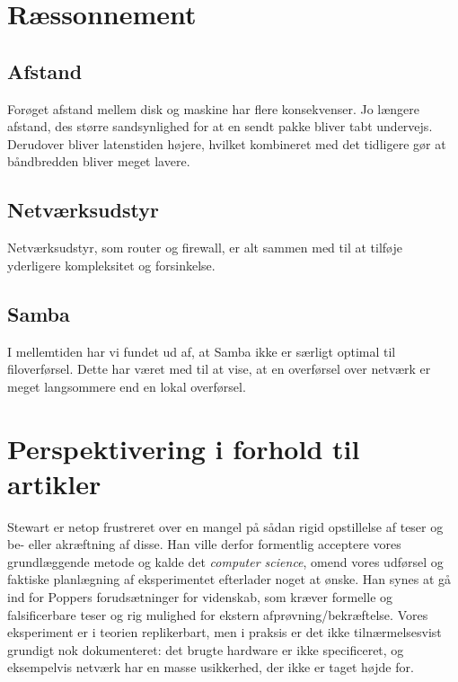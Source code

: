 \documentclass{article}
\begin{document}
\section{Ræssonnement}

\subsection{Afstand}
Forøget afstand mellem disk og maskine har flere konsekvenser. Jo længere afstand, des større sandsynlighed for at en sendt pakke bliver tabt undervejs. Derudover bliver latenstiden højere, hvilket kombineret med det tidligere gør at båndbredden bliver meget lavere.

\subsection{Netværksudstyr}
Netværksudstyr, som router og firewall, er alt sammen med til at tilføje yderligere kompleksitet og forsinkelse.

\subsection{Samba}
I mellemtiden har vi fundet ud af, at Samba ikke er særligt optimal til filoverførsel. Dette har været med til at vise, at en overførsel over netværk er meget langsommere end en lokal overførsel.

\section{Perspektivering i forhold til artikler}

Stewart er netop frustreret over en mangel på sådan rigid opstillelse af teser og be- eller akræftning af disse. Han ville derfor formentlig acceptere vores grundlæggende metode og kalde det \textit{computer science}, omend vores udførsel og faktiske planlægning af eksperimentet efterlader noget at ønske. Han synes at gå ind for Poppers forudsætninger for videnskab, som kræver formelle og falsificerbare teser og rig mulighed for ekstern afprøvning/bekræftelse. Vores eksperiment er i teorien replikerbart, men i praksis er det ikke tilnærmelsesvist grundigt nok dokumenteret: det brugte hardware er ikke specificeret, og eksempelvis netværk har en masse usikkerhed, der ikke er taget højde for.   
\end{document}
